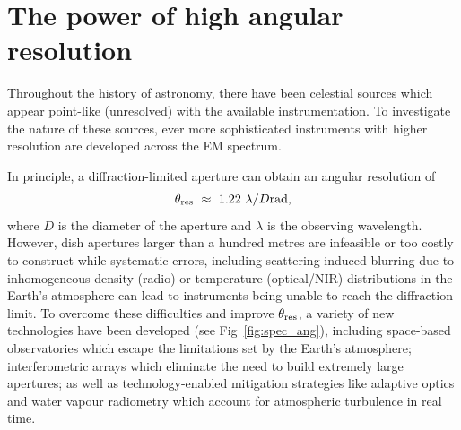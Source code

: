 \section{The power of high angular resolution}
Throughout the history of astronomy, there have been celestial sources which appear point-like (unresolved) with the available instrumentation. To investigate the nature of these sources, ever more sophisticated instruments with higher resolution are developed across the EM spectrum. 

In principle, a diffraction-limited aperture can obtain an angular resolution of
\begin{equation}\label{eq:ang_res}
 \theta_{\rm res}\ \approx \ 1.22\ \lambda / D {\rm rad},
\end{equation}
where $D$ is the diameter of the aperture and $\lambda$ is the observing wavelength. However, dish apertures larger than a hundred metres are infeasible or too costly to construct while systematic errors, including scattering-induced blurring due to inhomogeneous density (radio) or temperature (optical/NIR) distributions in the Earth's atmosphere can lead to instruments being unable to reach the diffraction limit. To overcome these difficulties and improve $\theta_{\rm res}$, a variety of new technologies have been developed (see Fig~\ref{fig:spec_ang}), including space-based observatories which escape the limitations set by the Earth's atmosphere; interferometric arrays which eliminate the need to build extremely large apertures; as well as technology-enabled mitigation strategies like adaptive optics and water vapour radiometry which account for atmospheric turbulence in real time. 


